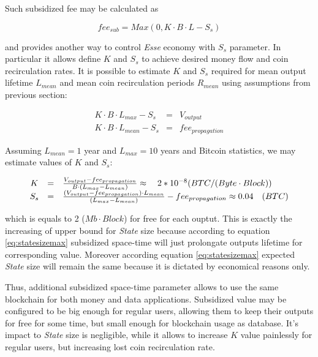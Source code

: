 \documentclass[]{article}   %
\newcommand{\esse}{\textit{Esse}}
\newcommand{\state}{\textit{State}}
\begin{document}
Such subsidized fee may be calculated as

\begin{equation}
fee_{sub} = Max(0, K \cdot B \cdot L - S_s)
\end{equation}

and provides another way to control \esse{} economy with $S_s$ parameter. In particular it allows define $K$ and $S_s$ to achieve desired money flow and coin recirculation rates. It is possible to estimate $K$ and $S_s$ required for mean output lifetime $L_{mean}$ and mean coin recirculation periods $R_{mean}$ using assumptions from previous section:

\begin{equation}
  \begin{array}{ccl}
   K \cdot B \cdot L_{max} - S_s & = & V_{output} \\
   K \cdot B \cdot L_{mean} - S_s & = & fee_{propagation}
  \end{array}
\end{equation}

Assuming $L_{mean}=1$ year and $L_{max}=10$ years and Bitcoin statistics, we may estimate values of $K$ and $S_s$:

\begin{equation}
  \begin{array}{ccl}
   K & = & {V_{output} - fee_{propagation} \over B \cdot (L_{max} - L_{mean})} \approx \quad 2*10^{-8} ({BTC / (Byte \cdot Block)}) \\
   S_s & = & {(V_{output} - fee_{propagation}) \cdot L_{mean} \over (L_{max} - L_{mean})} - fee_{propagation} \approx 0.04\quad(BTC)
  \end{array}
\end{equation}

which is equals to 2 ($Mb \cdot Block$) for free for each ouptut. This is exactly the increasing of upper bound for \state{} size because according to equation \ref{eq:statesizemax} subsidized space-time will just prolongate outputs lifetime for corresponding value. Moreover according equation \ref{eq:statesizemax} expected \state{} size will remain the same because it is dictated by economical reasons only.

Thus, additional subsidized space-time parameter allows to use the same blockchain for both money and data applications. Subsidized value may be configured to be big enough for regular users, allowing them to keep their outputs for free for some time, but small enough for blockchain usage as database. It's impact to \state{} size is negligible, while it allows to increase $K$ value painlessly for regular users, but increasing lost coin recirculation rate.
\end{document}
